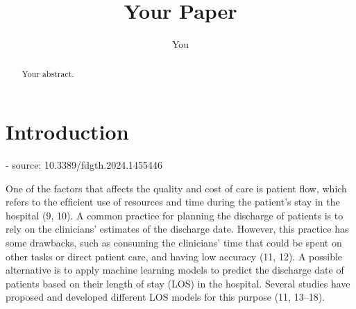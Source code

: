 \documentclass{article}
\title{Your Paper}
\author{You}
\begin{document}
\maketitle

\begin{abstract}
Your abstract.
\end{abstract}

\linenumbers

\section{Introduction}

- source: 10.3389/fdgth.2024.1455446

One of the factors that affects the quality and cost of care is
patient ﬂow, which refers to the efﬁcient use of resources and
time during the patient’s stay in the hospital (9, 10). A common
practice for planning the discharge of patients is to rely on the
clinicians’ estimates of the discharge date. However, this practice
has some drawbacks, such as consuming the clinicians’ time that
could be spent on other tasks or direct patient care, and having
low accuracy (11, 12). A possible alternative is to apply machine
learning models to predict the discharge date of patients based
on their length of stay (LOS) in the hospital. Several studies have
proposed and developed different LOS models for this purpose
(11, 13–18).






\end{document}
